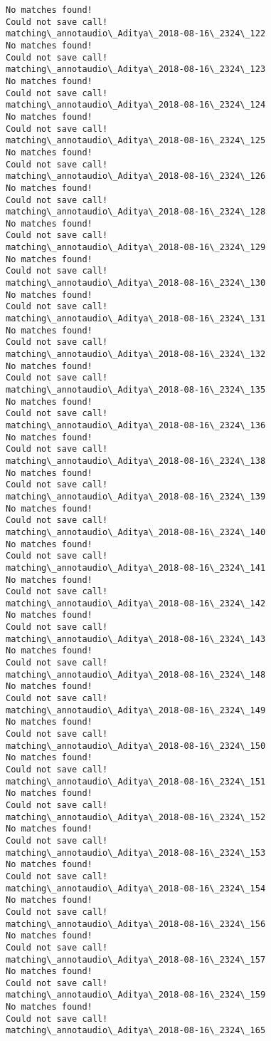 \documentclass[11pt]{article}
\begin{document}
\begin{Verbatim}[commandchars=\\\{\}]
No matches found!
Could not save call!
matching\_annotaudio\_Aditya\_2018-08-16\_2324\_122
No matches found!
Could not save call!
matching\_annotaudio\_Aditya\_2018-08-16\_2324\_123
No matches found!
Could not save call!
matching\_annotaudio\_Aditya\_2018-08-16\_2324\_124
No matches found!
Could not save call!
matching\_annotaudio\_Aditya\_2018-08-16\_2324\_125
No matches found!
Could not save call!
matching\_annotaudio\_Aditya\_2018-08-16\_2324\_126
No matches found!
Could not save call!
matching\_annotaudio\_Aditya\_2018-08-16\_2324\_128
No matches found!
Could not save call!
matching\_annotaudio\_Aditya\_2018-08-16\_2324\_129
No matches found!
Could not save call!
matching\_annotaudio\_Aditya\_2018-08-16\_2324\_130
No matches found!
Could not save call!
matching\_annotaudio\_Aditya\_2018-08-16\_2324\_131
No matches found!
Could not save call!
matching\_annotaudio\_Aditya\_2018-08-16\_2324\_132
No matches found!
Could not save call!
matching\_annotaudio\_Aditya\_2018-08-16\_2324\_135
No matches found!
Could not save call!
matching\_annotaudio\_Aditya\_2018-08-16\_2324\_136
No matches found!
Could not save call!
matching\_annotaudio\_Aditya\_2018-08-16\_2324\_138
No matches found!
Could not save call!
matching\_annotaudio\_Aditya\_2018-08-16\_2324\_139
No matches found!
Could not save call!
matching\_annotaudio\_Aditya\_2018-08-16\_2324\_140
No matches found!
Could not save call!
matching\_annotaudio\_Aditya\_2018-08-16\_2324\_141
No matches found!
Could not save call!
matching\_annotaudio\_Aditya\_2018-08-16\_2324\_142
No matches found!
Could not save call!
matching\_annotaudio\_Aditya\_2018-08-16\_2324\_143
No matches found!
Could not save call!
matching\_annotaudio\_Aditya\_2018-08-16\_2324\_148
No matches found!
Could not save call!
matching\_annotaudio\_Aditya\_2018-08-16\_2324\_149
No matches found!
Could not save call!
matching\_annotaudio\_Aditya\_2018-08-16\_2324\_150
No matches found!
Could not save call!
matching\_annotaudio\_Aditya\_2018-08-16\_2324\_151
No matches found!
Could not save call!
matching\_annotaudio\_Aditya\_2018-08-16\_2324\_152
No matches found!
Could not save call!
matching\_annotaudio\_Aditya\_2018-08-16\_2324\_153
No matches found!
Could not save call!
matching\_annotaudio\_Aditya\_2018-08-16\_2324\_154
No matches found!
Could not save call!
matching\_annotaudio\_Aditya\_2018-08-16\_2324\_156
No matches found!
Could not save call!
matching\_annotaudio\_Aditya\_2018-08-16\_2324\_157
No matches found!
Could not save call!
matching\_annotaudio\_Aditya\_2018-08-16\_2324\_159
No matches found!
Could not save call!
matching\_annotaudio\_Aditya\_2018-08-16\_2324\_165

\end{Verbatim}
\end{document}
